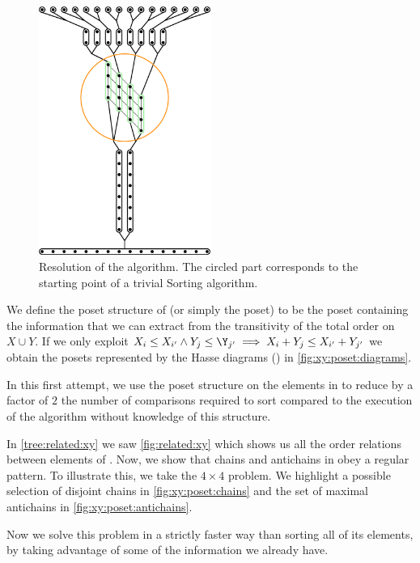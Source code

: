 \begin{figure}
\centering
\includegraphics[width=0.5\textwidth,angle=90]{fig/x+y/poset/mergexy}
\caption{Resolution of the \mergesort algorithm. The circled part
corresponds to the starting point of a trivial Sorting \XY algorithm.}
\label{fig:xy:poset:mergexy}
\end{figure}

We define the poset structure of \XY (or simply the \XY poset) to be the poset
containing the information that we can extract from the transitivity of the
total order on \(X \cup Y\). If we only exploit
\(X_i \le X_{i'} \land Y_j \le \Y_{j'} \implies X_i + Y_j \le X_{i'} + Y_{j'}\)
we obtain the posets represented by the Hasse diagrams ()
in \ref{fig:xy:poset:diagrams}.

In this first attempt, we use the poset structure on the elements
in \XY to reduce by a factor of $2$ the number of comparisons
required to sort \XY compared to the execution of the \mergesort algorithm
without knowledge of this structure.

In \ref{tree:related:xy} we saw \ref{fig:related:xy} which shows us all the order
relations between elements of \XY. Now, we show that chains and antichains
in \XY obey a regular pattern. To illustrate this, we take the $4 \times 4$
\XY problem. We highlight a possible selection of disjoint chains in
\ref{fig:xy:poset:chains} and the set of maximal antichains in
\ref{fig:xy:poset:antichains}.

Now we solve this problem in a strictly faster way than sorting all
of its elements, by taking advantage of some of the information we already have.

